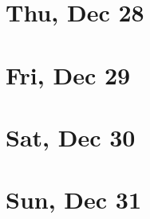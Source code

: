 	\section{Thu, Dec 28}
		
		
	\section{Fri, Dec 29}
		
		
	\section{Sat, Dec 30}
		
		
	\section{Sun, Dec 31}
		
		
